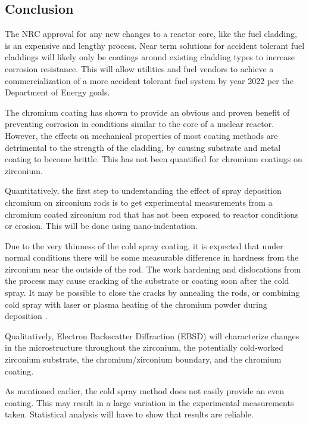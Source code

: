 \documentclass{article}
\begin{document}
\subsection*{Conclusion}
The NRC approval for any new changes to a reactor core, like the fuel cladding, is an expensive and lengthy process.  Near term solutions for accident tolerant fuel claddings will likely only be coatings around existing cladding types to increase corrosion resistance.  This will allow utilities and fuel vendors to achieve a commercialization of a more accident tolerant fuel system by year 2022 per the Department of Energy goals.  

The chromium coating has shown to provide an obvious and proven benefit of preventing corrosion in conditions similar to the core of a nuclear reactor\cite{conference}.  However, the effects on mechanical properties of most coating methods are detrimental to the strength of the cladding, by causing substrate and metal coating to become brittle\cite{highvelmicro}. This has not been quantified for chromium coatings on zirconium.  

Quantitatively, the first step to understanding the effect of spray deposition chromium on zirconium rods is to get experimental measurements from a chromium coated zirconium rod that has not been exposed to reactor conditions or erosion.  This will be done using nano-indentation.

Due to the very thinness of the cold spray coating, it is expected that under normal conditions there will be some measurable difference in hardness from the zirconium near the outside of the rod.  The work hardening and dislocations from the process may cause cracking of the substrate or coating soon after the cold spray.  It may be possible to close the cracks by annealing the rods, or combining cold spray with laser or plasma heating of the chromium powder during deposition \cite{highvelmicro}.

Qualitatively, Electron Backscatter Diffraction (EBSD) will characterize changes in the microstructure throughout the zirconium, the potentially cold-worked zirconium substrate, the chromium/zirconium boundary, and the chromium coating.  

As mentioned earlier, the cold spray method does not easily provide an even coating.  This may result in a large variation in the experimental measurements taken.  Statistical analysis will have to show that results are reliable.



\end{document}
